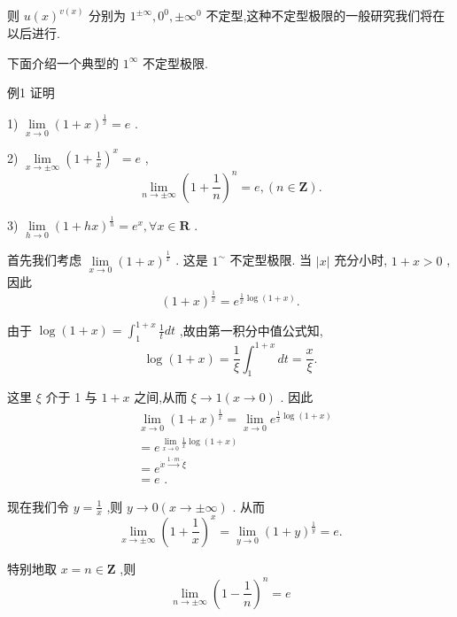 则 $u{\left( x\right) }^{v\left( x\right) }$ 分别为 ${1}^{\pm \infty },{0}^{0}, \pm  {\infty }^{0}$ 不定型,这种不定型极限的一般研究我们将在以后进行.

下面介绍一个典型的 ${1}^{\infty }$ 不定型极限.

例1 证明

1) $\mathop{\lim }\limits_{{x \rightarrow  0}}{\left( 1 + x\right) }^{\frac{1}{x}} = e$ .

2) $\mathop{\lim }\limits_{{x \rightarrow   \pm  \infty }}{\left( 1 + \frac{1}{x}\right) }^{x} = e$ ,
$$\mathop{\lim }\limits_{{n \rightarrow   \pm  \infty }}{\left( 1 + \frac{1}{n}\right) }^{n} = e,\left( {n \in  \mathbf{Z}}\right) .$$

3) $\mathop{\lim }\limits_{{h \rightarrow  0}}{\left( 1 + hx\right) }^{\frac{1}{h}} = {e}^{x},\forall x \in  \mathbf{R}$ .

首先我们考虑 $\mathop{\lim }\limits_{{x \rightarrow  0}}{\left( 1 + x\right) }^{\frac{1}{x}}$ . 这是 ${1}^{ \sim  }$ 不定型极限. 当 $\left| x\right|$ 充分小时, $1 + x > 0$ ,因此
$${\left( 1 + x\right) }^{\frac{1}{x}} = {e}^{\frac{1}{x}\log \left( {1 + x}\right) }.$$

由于 $\log \left( {1 + x}\right)  = {\int }_{1}^{1 + x}\frac{1}{t}{dt}$ ,故由第一积分中值公式知,
$$\log \left( {1 + x}\right)  = \frac{1}{\xi }{\int }_{1}^{1 + x}{dt} = \frac{x}{\xi }.$$

这里 $\xi$ 介于 1 与 $1 + x$ 之间,从而 $\xi  \rightarrow  1\left( {x \rightarrow  0}\right)$ . 因此
\begin{align*}
	&\mathop{\lim }\limits_{{x \rightarrow  0}}{\left( 1 + x\right) }^{\frac{1}{x}} = \mathop{\lim }\limits_{{x \rightarrow  0}}{e}^{\frac{1}{x}\log \left( {1 + x}\right) }\\
	&= {e}^{\mathop{\lim }\limits_{{x \rightarrow  0}}\frac{1}{x}\log \left( {1 + x}\right) }\\
	&= {e}^{\dot{x}\overset{1 \cdot  m}{ \rightarrow  }\dot{\xi }}\\
	&= e\text{ . }
\end{align*}

现在我们令 $y = \frac{1}{x}$ ,则 $y \rightarrow  0\left( {x \rightarrow   \pm  \infty }\right)$ . 从而
$$\mathop{\lim }\limits_{{x \rightarrow   \pm  \infty }}{\left( 1 + \frac{1}{x}\right) }^{x} = \mathop{\lim }\limits_{{y \rightarrow  0}}{\left( 1 + y\right) }^{\frac{1}{y}} = e.$$

特别地取 $x = n \in  \mathbf{Z}$ ,则
$$\mathop{\lim }\limits_{{n \rightarrow   \pm  \infty }}{\left( 1 - \frac{1}{n}\right) }^{n} = e$$

